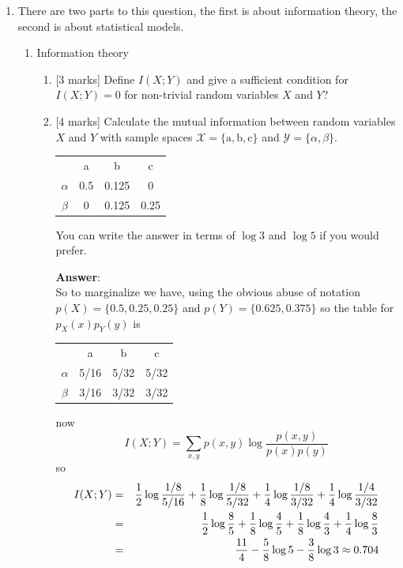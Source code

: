 \documentclass{article}
\newif\ifanswer
\begin{document}
\begin{enumerate}
\item There are two parts to this question, the first is about information theory, the second is about statistical models.
  \begin{enumerate}
  \item{Information theory}
\begin{enumerate}
\item{}[3 marks] Define $I(X;Y)$ and give a sufficient condition for $I(X;Y)=0$ for non-trivial random variables $X$ and $Y$?
  \ifanswer \textbf{Answer}:\\
  \begin{equation}
  I(X;Y)=\sum_{x,y}p(x,y)\log{\frac{p(x,y)}{p(x)p(y)}}
  \end{equation}
  and this is zero if the argument of the log is zero, that is $p(x,y)=p(x)p(y)$ for all $x$ and $y$, that is when $X$ and $Y$ are independent.
  \fi
\item{}[4 marks]
 Calculate the mutual information between random variables $X$ and $Y$ with sample spaces $\mathcal{X}=\{\mbox{a},\mbox{b},\mbox{c}\}$ and $\mathcal{Y}=\{\alpha,\beta\}$.
  \begin{center}
  \begin{tabular}{c|ccc}
    \hline
    &\mbox{a}&\mbox{b}&\mbox{c}\\
    $\alpha$&0.5&0.125&0\\
    $\beta$&0&0.125&0.25
    \end{tabular}
  \end{center}
You can write the answer in terms of $\log{3}$ and $\log{5}$ if you would prefer.
  
  \ifanswer \textbf{Answer}:\\
So to marginalize we have, using the obvious abuse of notation $p(X)=\{0.5,0.25,0.25\}$ and $p(Y)=\{0.625,0.375\}$ so the table for $p_X(x)p_Y(y)$ is
  \begin{center}
  \begin{tabular}{c|ccc}
    \hline
    &\mbox{a}&\mbox{b}&\mbox{c}\\
    $\alpha$&5/16&5/32&5/32\\
    $\beta$&3/16&3/32&3/32
    \end{tabular}
  \end{center}
  now
  \begin{equation}
    I(X;Y)=\sum_{x,y}p(x,y)\log{\frac{p(x,y)}{p(x)p(y)}}
  \end{equation}
  so
  \begin{eqnarray}
    I(X;Y)&=&\frac{1}{2}\log{\frac{1/8}{5/16}}+\frac{1}{8}\log{\frac{1/8}{5/32}}+\frac{1}{4}\log{\frac{1/8}{3/32}}+\frac{1}{4}\log{\frac{1/4}{3/32}}\cr
    &=&\frac{1}{2}\log{\frac{8}{5}}+\frac{1}{8}\log{\frac{4}{5}}+\frac{1}{8}\log{\frac{4}{3}}+\frac{1}{4}\log{\frac{8}{3}}\cr
    &=&\frac{11}{4}-\frac{5}{8}\log{5}-\frac{3}{8}\log{3}\approx 0.704
  \end{eqnarray}


\end{enumerate}
\end{enumerate}
\end{enumerate}
\end{document}
